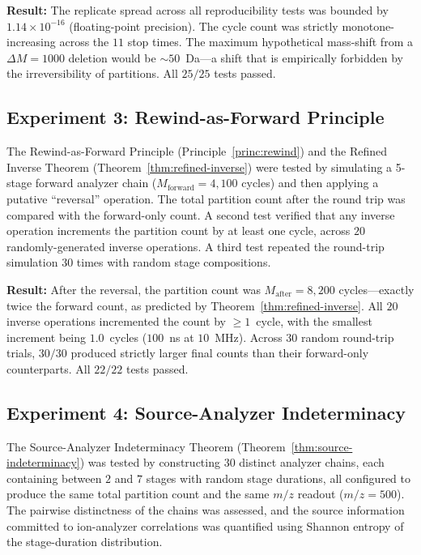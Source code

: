 \documentclass[twocolumn,10pt,a4paper]{article}
\theoremstyle{definition}
\theoremstyle{remark}
\begin{document}
\textbf{Result:} The replicate spread across all reproducibility tests was bounded by $1.14 \times 10^{-16}$ (floating-point precision). The cycle count was strictly monotone-increasing across the $11$ stop times. The maximum hypothetical mass-shift from a $\Delta M = 1000$ deletion would be $\sim 50$~Da---a shift that is empirically forbidden by the irreversibility of partitions. All $25/25$ tests passed.



\subsection{Experiment 3: Rewind-as-Forward Principle}
\label{sec:val-E3}

The Rewind-as-Forward Principle (Principle~\ref{princ:rewind}) and the Refined Inverse Theorem (Theorem~\ref{thm:refined-inverse}) were tested by simulating a 5-stage forward analyzer chain ($M_{\mathrm{forward}} = 4{,}100$ cycles) and then applying a putative ``reversal'' operation. The total partition count after the round trip was compared with the forward-only count. A second test verified that any inverse operation increments the partition count by at least one cycle, across $20$ randomly-generated inverse operations. A third test repeated the round-trip simulation $30$ times with random stage compositions.

\textbf{Result:} After the reversal, the partition count was $M_{\mathrm{after}} = 8{,}200$ cycles---exactly twice the forward count, as predicted by Theorem~\ref{thm:refined-inverse}. All $20$ inverse operations incremented the count by $\geq 1$~cycle, with the smallest increment being $1.0$~cycles ($100$~ns at $10$~MHz). Across $30$ random round-trip trials, $30/30$ produced strictly larger final counts than their forward-only counterparts. All $22/22$ tests passed.



\subsection{Experiment 4: Source-Analyzer Indeterminacy}
\label{sec:val-E4}

The Source-Analyzer Indeterminacy Theorem (Theorem~\ref{thm:source-indeterminacy}) was tested by constructing $30$ distinct analyzer chains, each containing between $2$ and $7$ stages with random stage durations, all configured to produce the same total partition count and the same $m/z$ readout ($m/z = 500$). The pairwise distinctness of the chains was assessed, and the source information committed to ion-analyzer correlations was quantified using Shannon entropy of the stage-duration distribution.
\end{document}
